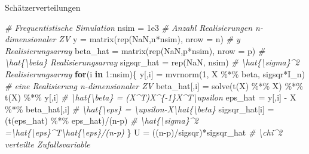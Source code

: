 \documentclass[
  8pt,
  ignorenonframetext,
]{beamer}
\newenvironment{Shaded}{\begin{snugshade}}{\end{snugshade}}
\newcommand{\AttributeTok}[1]{\textcolor[rgb]{0.77,0.63,0.00}{#1}}
\newcommand{\CommentTok}[1]{\textcolor[rgb]{0.56,0.35,0.01}{\textit{#1}}}
\newcommand{\ConstantTok}[1]{\textcolor[rgb]{0.00,0.00,0.00}{#1}}
\newcommand{\ControlFlowTok}[1]{\textcolor[rgb]{0.13,0.29,0.53}{\textbf{#1}}}
\newcommand{\DecValTok}[1]{\textcolor[rgb]{0.00,0.00,0.81}{#1}}
\newcommand{\FloatTok}[1]{\textcolor[rgb]{0.00,0.00,0.81}{#1}}
\newcommand{\FunctionTok}[1]{\textcolor[rgb]{0.00,0.00,0.00}{#1}}
\newcommand{\NormalTok}[1]{#1}
\newcommand{\OtherTok}[1]{\textcolor[rgb]{0.56,0.35,0.01}{#1}}
\newcommand{\SpecialCharTok}[1]{\textcolor[rgb]{0.00,0.00,0.00}{#1}}
\begin{document}
\begin{frame}[fragile]{Schätzerverteilungen}
\begin{Shaded}
\begin{Highlighting}[]
\CommentTok{\# Frequentistische Simulation}
\NormalTok{nsim       }\OtherTok{=} \FloatTok{1e3}                                       \CommentTok{\# Anzahl Realisierungen n{-}dimensionaler ZV}
\NormalTok{y          }\OtherTok{=} \FunctionTok{matrix}\NormalTok{(}\FunctionTok{rep}\NormalTok{(}\ConstantTok{NaN}\NormalTok{,n}\SpecialCharTok{*}\NormalTok{nsim), }\AttributeTok{nrow =}\NormalTok{ n)         }\CommentTok{\# y Realisierungsarray}
\NormalTok{beta\_hat   }\OtherTok{=} \FunctionTok{matrix}\NormalTok{(}\FunctionTok{rep}\NormalTok{(}\ConstantTok{NaN}\NormalTok{,p}\SpecialCharTok{*}\NormalTok{nsim), }\AttributeTok{nrow =}\NormalTok{ p)         }\CommentTok{\# \textbackslash{}hat\{\textbackslash{}beta\} Realisierungsarray}
\NormalTok{sigsqr\_hat }\OtherTok{=} \FunctionTok{rep}\NormalTok{(}\ConstantTok{NaN}\NormalTok{, nsim)                            }\CommentTok{\# \textbackslash{}hat\{\textbackslash{}sigma\}\^{}2 Realisierungsarray}
\ControlFlowTok{for}\NormalTok{(i }\ControlFlowTok{in} \DecValTok{1}\SpecialCharTok{:}\NormalTok{nsim)\{}
\NormalTok{  y[,i]         }\OtherTok{=} \FunctionTok{mvrnorm}\NormalTok{(}\DecValTok{1}\NormalTok{, X }\SpecialCharTok{\%*\%}\NormalTok{ beta, sigsqr}\SpecialCharTok{*}\NormalTok{I\_n)   }\CommentTok{\# eine Realisierung n{-}dimensionaler ZV}
\NormalTok{  beta\_hat[,i]  }\OtherTok{=} \FunctionTok{solve}\NormalTok{(}\FunctionTok{t}\NormalTok{(X) }\SpecialCharTok{\%*\%}\NormalTok{ X) }\SpecialCharTok{\%*\%} \FunctionTok{t}\NormalTok{(X) }\SpecialCharTok{\%*\%}\NormalTok{ y[,i] }\CommentTok{\# \textbackslash{}hat\{\textbackslash{}beta\}    = (X\^{}T)X\^{}\{{-}1\}X\^{}T\textbackslash{}upsilon}
\NormalTok{  eps\_hat       }\OtherTok{=}\NormalTok{ y[,i] }\SpecialCharTok{{-}}\NormalTok{ X }\SpecialCharTok{\%*\%}\NormalTok{ beta\_hat[,i]           }\CommentTok{\# \textbackslash{}hat\{\textbackslash{}eps\}     = \textbackslash{}upsilon{-}X\textbackslash{}hat\{\textbackslash{}beta\}}
\NormalTok{  sigsqr\_hat[i] }\OtherTok{=}\NormalTok{ (}\FunctionTok{t}\NormalTok{(eps\_hat) }\SpecialCharTok{\%*\%}\NormalTok{ eps\_hat)}\SpecialCharTok{/}\NormalTok{(n}\SpecialCharTok{{-}}\NormalTok{p)       }\CommentTok{\# \textbackslash{}hat\{\textbackslash{}sigma\}\^{}2 =\textbackslash{}hat\{\textbackslash{}eps\}\^{}T\textbackslash{}hat\{\textbackslash{}eps\}/(n{-}p)}
\NormalTok{\}}
\NormalTok{U }\OtherTok{=}\NormalTok{ ((n}\SpecialCharTok{{-}}\NormalTok{p)}\SpecialCharTok{/}\NormalTok{sigsqr)}\SpecialCharTok{*}\NormalTok{sigsqr\_hat                          }\CommentTok{\# \textbackslash{}chi\^{}2 verteilte Zufallsvariable}
\end{Highlighting}
\end{Shaded}
\end{frame}
\end{document}
